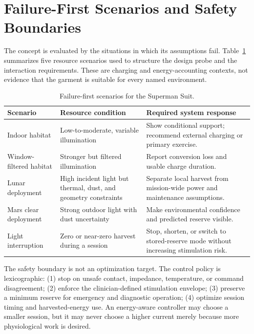 \documentclass[runningheads]{llncs}
\begin{document}
\section{Failure-First Scenarios and Safety Boundaries}

The concept is evaluated by the situations in which its assumptions fail. Table~\ref{tab:scenarios} summarizes five resource scenarios used to structure the design probe and the interaction requirements. These are charging and energy-accounting contexts, not evidence that the garment is suitable for every named environment.

\begin{table}[ht]
\caption{Failure-first scenarios for the Superman Suit.}
\label{tab:scenarios}
\centering
\small
\begin{tabular}{p{}p{}p{}}
\toprule
Scenario & Resource condition & Required system response \\
\midrule
Indoor habitat & Low-to-moderate, variable illumination & Show conditional support; recommend external charging or primary exercise. \\
Window-filtered habitat & Stronger but filtered illumination & Report conversion loss and usable charge duration. \\
Lunar deployment & High incident light but thermal, dust, and geometry constraints & Separate local harvest from mission-wide power and maintenance assumptions. \\
Mars clear deployment & Strong outdoor light with dust uncertainty & Make environmental confidence and predicted reserve visible. \\
Light interruption & Zero or near-zero harvest during a session & Stop, shorten, or switch to stored-reserve mode without increasing stimulation risk. \\
\bottomrule
\end{tabular}
\end{table}

The safety boundary is not an optimization target. The control policy is lexicographic: (1) stop on unsafe contact, impedance, temperature, or command disagreement; (2) enforce the clinician-defined stimulation envelope; (3) preserve a minimum reserve for emergency and diagnostic operation; (4) optimize session timing and harvested-energy use. An energy-aware controller may choose a smaller session, but it may never choose a higher current merely because more physiological work is desired.
\end{document}
